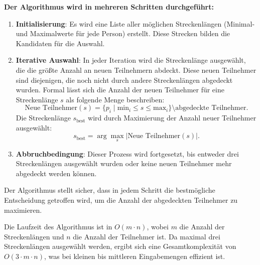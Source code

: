 \documentclass[a4paper,10pt,ngerman]{scrartcl}
\begin{document}
\textbf{Der Algorithmus wird in mehreren Schritten durchgeführt:}
\begin{enumerate}
    \item \textbf{Initialisierung}: 
    Es wird eine Liste aller möglichen Streckenlängen (Minimal- und Maximalwerte für jede Person) erstellt. Diese Strecken bilden die Kandidaten für die Auswahl.
    
    \item \textbf{Iterative Auswahl}:
    In jeder Iteration wird die Streckenlänge ausgewählt, die die größte Anzahl an neuen Teilnehmern abdeckt. Diese neuen Teilnehmer sind diejenigen, die noch nicht durch andere Streckenlängen abgedeckt wurden. Formal lässt sich die Anzahl der neuen Teilnehmer für eine Streckenlänge \( s \) als folgende Menge beschreiben:
    \[
    \text{Neue Teilnehmer}(s) = \{ p_i \mid \text{min}_i \leq s \leq \text{max}_i \} \setminus \text{abgedeckte Teilnehmer}.
    \]
    Die Streckenlänge \( s_{\text{best}} \) wird durch Maximierung der Anzahl neuer Teilnehmer ausgewählt:
    \[
    s_{\text{best}} = \arg\max_s |\text{Neue Teilnehmer}(s)|.
    \]
    
    \item \textbf{Abbruchbedingung}:
    Dieser Prozess wird fortgesetzt, bis entweder drei Streckenlängen ausgewählt wurden oder keine neuen Teilnehmer mehr abgedeckt werden können.
\end{enumerate}

Der Algorithmus stellt sicher, dass in jedem Schritt die bestmögliche Entscheidung getroffen wird, um die Anzahl der abgedeckten Teilnehmer zu maximieren. 

Die Laufzeit des Algorithmus ist in \( O(m \cdot n) \), wobei \( m \) die Anzahl der Streckenlängen und \( n \) die Anzahl der Teilnehmer ist. Da maximal drei Streckenlängen ausgewählt werden, ergibt sich eine Gesamtkomplexität von \( O(3 \cdot m \cdot n) \), was bei kleinen bis mittleren Eingabemengen effizient ist.
\end{document}
